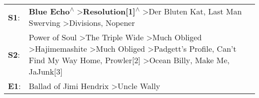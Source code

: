 \begin{supertabular}{p{0.03\textwidth}p{0.92\textwidth}}
 \textbf{S1}:  &                                                                                                                                                                                                                             \textbf{Blue Echo\textsuperscript{$\wedge$}} \textgreater \enspace \textbf{Resolution[1]\textsuperscript{$\wedge$}} \textgreater \enspace Der Bluten Kat\textsuperscript{}, \enspace Last Man Swerving\textsuperscript{} \textgreater \enspace Divisions\textsuperscript{}, \enspace Nopener\textsuperscript{}  \enspace  \\
 \textbf{S2}:  &  Power of Soul\textsuperscript{} \textgreater \enspace The Triple Wide\textsuperscript{} \textgreater \enspace Much Obliged\textsuperscript{} \textgreater \enspace Hajimemashite\textsuperscript{} \textgreater \enspace Much Obliged\textsuperscript{} \textgreater \enspace Padgett's Profile\textsuperscript{}, \enspace Can't Find My Way Home\textsuperscript{}, \enspace Prowler[2]\textsuperscript{} \textgreater \enspace Ocean Billy\textsuperscript{}, \enspace Make Me\textsuperscript{}, \enspace JaJunk[3]\textsuperscript{}  \enspace  \\
 \textbf{E1}:  &                                                                                                                                                                                                                                                                                                                                                                                                                                               Ballad of Jimi Hendrix\textsuperscript{} \textgreater \enspace Uncle Wally\textsuperscript{}  \enspace  \\
\end{supertabular}

